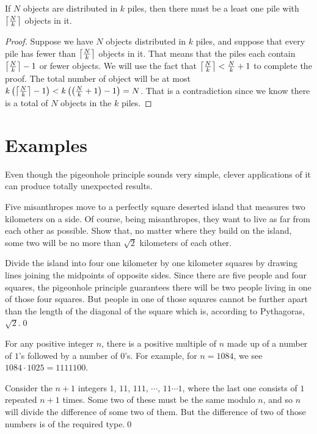 \begin{thm} If $N$
objects are distributed in $k$ piles, then there must be a least one pile with
$\left\lceil{N\over k}\right\rceil$ objects in it.
\end{thm}
\begin{proof}
Suppose we have $N$ objects distributed in $k$ piles, and suppose that every
pile has fewer than $\left\lceil{N\over k}\right\rceil$ objects in it. 
That means that the piles each contain $\left\lceil{N\over k}\right\rceil-1$ or fewer
objects. We will use the fact that $\left\lceil{N\over k}\right\rceil< {N\over k}+1$
to complete the proof. 
The
total number of object will be at most 
$k\left(\left\lceil{N\over k}\right\rceil-1\right)< k\left(\left({N\over k}+1\right)-1\right)
= N$. That is a contradiction since we know there is a total of $N$ objects in the
$k$ piles.
\end{proof}


\section{Examples}
Even though the pigeonhole principle sounds very simple, clever applications
of it can produce totally unexpected results. 

\begin{exmp}
 Five misanthropes move to a perfectly square deserted island that
 measures two kilometers on a side. Of course, being misanthropes, they want to live 
 as far from each other as possible. Show that, no matter where they build on the
 island, some two will be no more than $\sqrt{2}$ kilometers of each other.
\end{exmp}
\begin{soln}
 Divide the island into four one kilometer by one kilometer
 squares by drawing lines joining the midpoints of opposite sides. Since there
 are five people and four squares, the pigeonhole principle guarantees there
 will be two people living in one of those four squares. But people in one of
 those squares cannot be further apart than the length of the diagonal of the
 square which is, according to Pythagoras, $\sqrt{2}$.\;\qed
\end{soln} 

\begin{exmp}
  For any positive integer $n$, there is a positive multiple of $n$
 made up of a number of $1$'s followed by a number of $0$'s. For example, for $n=1084$,
 we see
 $1084\cdot 1025 = 1111100$.
\end{exmp}
\begin{soln}
 Consider the $n+1$ integers $1$, $11$, $111$, $\cdots$, 
 $11\cdots1$, where the last one consists of $1$ repeated  $n+1$ times. Some two of these
 must be the same modulo $n$, and so $n$ will divide the difference of some two
 of them. But the difference of two of those numbers is of the required type.\;\qed
\end{soln}

